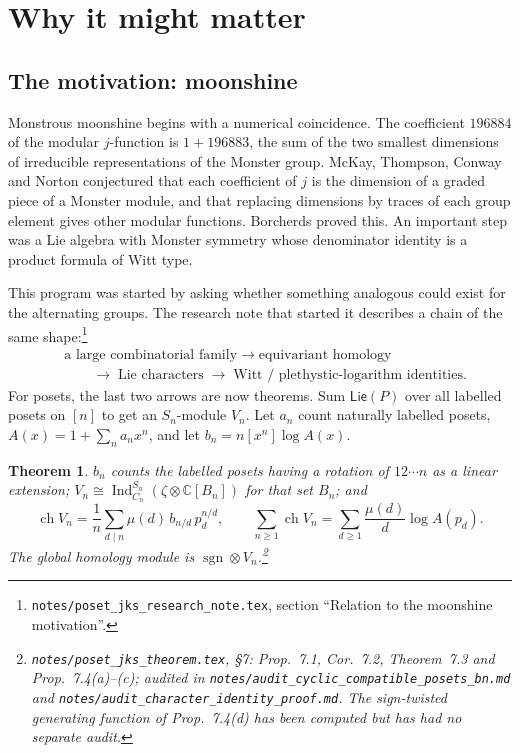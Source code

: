 \documentclass[11pt]{article}
\newtheorem{theorem}{Theorem}
\theoremstyle{definition}
\theoremstyle{remark}
\newcommand{\PLie}{\mathsf{Lie}}
\newcommand{\sgn}{\operatorname{sgn}}
\newcommand{\Ind}{\operatorname{Ind}}
\newcommand{\src}[1]{\nolinkurl{#1}}
\newcommand{\tagbox}[1]{\leavevmode\marginpar{\raggedright\fbox{\parbox{0.66in}{\centering\scriptsize\sffamily #1}}}}
\newcommand{\PROVEN}{\tagbox{PROVEN\\AUDITED}}
\begin{document}
\section{Why it might matter}

\subsection{The motivation: moonshine}

Monstrous moonshine begins with a numerical coincidence. The coefficient
$196884$ of the modular $j$-function is $1+196883$, the sum of the two
smallest dimensions of irreducible representations of the Monster group.
McKay, Thompson, Conway and Norton conjectured that each coefficient of $j$
is the dimension of a graded piece of a Monster module, and that replacing
dimensions by traces of each group element gives other modular functions.
Borcherds proved this. An important step was a Lie algebra with Monster
symmetry whose denominator identity is a product formula of Witt type.

This program was started by asking whether something analogous could exist
for the alternating groups. The research note that started it describes
a chain of the same shape:\footnote{\src{notes/poset_jks_research_note.tex},
section ``Relation to the moonshine motivation''.}
\begin{align*}
&\text{a large combinatorial family}\;\to\;\text{equivariant homology}\\
&\qquad\to\;\text{Lie characters}\;\to\;\text{Witt / plethystic-logarithm identities}.
\end{align*}
For posets, the last two arrows are now theorems. Sum $\PLie(P)$ over all labelled posets on
$[n]$ to get an $S_n$-module $V_n$. Let $a_n$ count naturally labelled posets,
$A(x)=1+\sum_na_nx^n$, and let $b_n=n[x^n]\log A(x)$.

\begin{theorem}\PROVEN
$b_n$ counts the labelled posets having a rotation of $12\cdots n$ as a linear
extension; $V_n\cong\Ind_{C_n}^{S_n}(\zeta\otimes\mathbb C[B_n])$ for that set
$B_n$; and
\[
\operatorname{ch}V_n=\frac1n\sum_{d\mid n}\mu(d)\,b_{n/d}\,p_d^{n/d},\qquad
\sum_{n\ge1}\operatorname{ch}V_n=\sum_{d\ge1}\frac{\mu(d)}d\log A(p_d).
\]
The global homology module is $\sgn\otimes V_n$.\footnote{%
\src{notes/poset_jks_theorem.tex}, \S7: Prop.~7.1, Cor.~7.2, Theorem~7.3 and
Prop.~7.4(a)--(c); audited in
\src{notes/audit_cyclic_compatible_posets_bn.md} and
\src{notes/audit_character_identity_proof.md}. The sign-twisted generating
function of Prop.~7.4(d) has been computed but has had no separate audit.}
\end{theorem}
\end{document}
